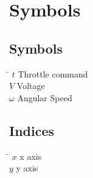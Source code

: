 \chapter*{Symbols}
\label{sec:symbols}

\section*{Symbols}

\begin{tabbing}
 \hspace*{1.6cm} \= \kill
  $t$                \> Throttle command\\[0.5ex] 					
  $V$                   \> Voltage \\[0.5ex]										
  $\omega$              \> Angular Speed \\[0.5ex]   		
\end{tabbing}

\section*{Indices}
\begin{tabbing}
 \hspace*{1.6cm}  \= \kill
 $x$ \> x axis \\[0.5ex]
 $y$ \> y axis \\[0.5ex]
\end{tabbing}

